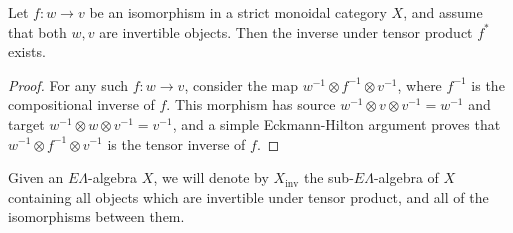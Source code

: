 \documentclass{amsbook} %
\newcommand{\id}{\textrm{id}}
\newcommand{\MorLn}{\mathrm{Mor}(L_n)}
\numberwithin{section}{chapter}
\begin{document}
\begin{lem} \label{tensinv_basic} Let $f \colon  w \to v$ be an isomorphism in a strict monoidal category $X$, and assume that both $w, v$ are invertible objects. Then the inverse under tensor product $f^*$ exists.
\end{lem}
\begin{proof}
For any such $f \colon  w \to v$, consider the map $w^{-1} \otimes f^{-1} \otimes v^{-1}$, where $f^{-1}$ is the compositional inverse of $f$. This morphism has source $w^{-1}\otimes v \otimes v^{-1} = w^{-1}$ and target $w^{-1} \otimes w \otimes v^{-1} = v^{-1}$, and a simple Eckmann-Hilton argument proves that $w^{-1} \otimes f^{-1} \otimes v^{-1}$ is the tensor inverse of $f$.
\end{proof}



\begin{Defi}\label{invdef} Given an $E\Lambda$-algebra $X$, we will denote by $X_{\mathrm{inv}}$ the sub-$E\Lambda$-algebra of $X$ containing all objects which are invertible under tensor product, and all of the isomorphisms between them. \end{Defi} 
\end{document}
